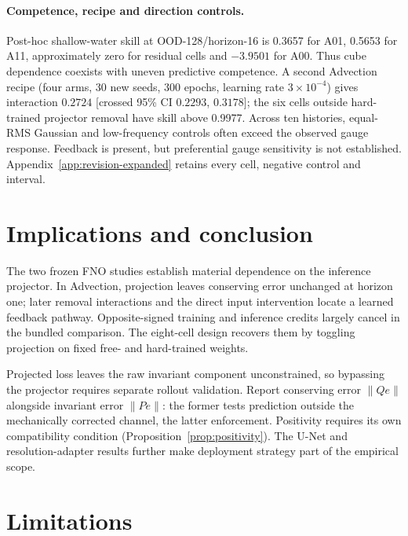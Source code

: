 \documentclass{article}
\begin{document}
\paragraph{Competence, recipe and direction controls.}
Post-hoc shallow-water skill at OOD-128/horizon-16 is 0.3657 for A01, 0.5653
for A11, approximately zero for residual cells and $-3.9501$ for A00. Thus
cube dependence coexists with uneven predictive competence. A second Advection
recipe (four arms, 30 new seeds, 300 epochs, learning rate $3\times10^{-4}$)
gives interaction $0.2724$ [crossed 95\% CI $0.2293$, $0.3178$]; the six cells
outside hard-trained projector removal have skill above 0.9977. Across ten
histories, equal-RMS Gaussian and low-frequency controls often exceed the
observed gauge response. Feedback is present, but preferential gauge sensitivity
is not established. Appendix~\ref{app:revision-expanded} retains every cell,
negative control and interval.

\section{Implications and conclusion}

The two frozen FNO studies establish material dependence on the inference
projector. In Advection, projection leaves conserving error unchanged at
horizon one; later removal interactions and the direct input intervention
locate a learned feedback pathway. Opposite-signed training and inference
credits largely cancel in the bundled comparison. The eight-cell design
recovers them by toggling projection on fixed free- and hard-trained weights.

Projected loss leaves the raw invariant component unconstrained, so bypassing
the projector requires separate rollout validation. Report conserving error
$\lVert Qe\rVert$ alongside invariant error $\lVert Pe\rVert$: the former tests
prediction outside the mechanically corrected channel, the latter enforcement.
Positivity requires its own compatibility condition (Proposition~\ref{prop:positivity}).
The U-Net and resolution-adapter results further make deployment strategy part
of the empirical scope.

\section{Limitations}
\end{document}
